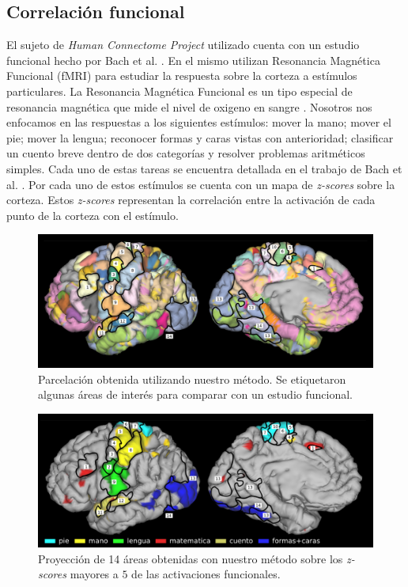 \subsection{Correlaci\'on funcional}
\label{sec:corr_funcional}

El sujeto de \textit{Human Connectome Project} utilizado cuenta con un 
estudio funcional hecho por Bach et al. \cite{Barch2013}. En el mismo
utilizan Resonancia Magn\'etica Funcional (fMRI) para estudiar la
respuesta sobre la corteza a est\'imulos particulares. La Resonancia 
Magn\'etica Funcional es un tipo especial de resonancia magn\'etica que
mide el nivel de oxigeno en sangre \cite{Ogawa1990}. Nosotros nos
enfocamos en las respuestas a los siguientes est\'imulos: mover la mano;
mover el pie; mover la lengua; reconocer formas y caras vistas con
anterioridad; clasificar un cuento breve dentro de dos categor\'ias y
resolver problemas aritm\'eticos simples. Cada uno de estas tareas se 
encuentra detallada en el trabajo de Bach et al. \cite{Barch2013}.
Por cada uno de estos est\'imulos se cuenta con un mapa de
\textit{z-scores} sobre la corteza.
Estos \textit{z-scores} representan la correlaci\'on entre la activaci\'on
de cada punto de la corteza con el est\'imulo. \\

\begin{figure}[h!]
    \includegraphics[width=\textwidth]{img/32k_labels.png}
    \caption{Parcelaci\'on obtenida utilizando nuestro m\'etodo. Se 
             etiquetaron algunas \'areas de inter\'es para comparar
             con un estudio funcional.}
    \label{fig:32k}
\end{figure}


\begin{figure}[h!]
    \includegraphics[width=\textwidth]{img/32k_z5.png}
    \caption{Proyecci\'on de 14 \'areas obtenidas con nuestro m\'etodo
             sobre los \textit{z-scores} mayores a $5$ de las activaciones
             funcionales.}
    \label{fig:32k_z5}
\end{figure}

